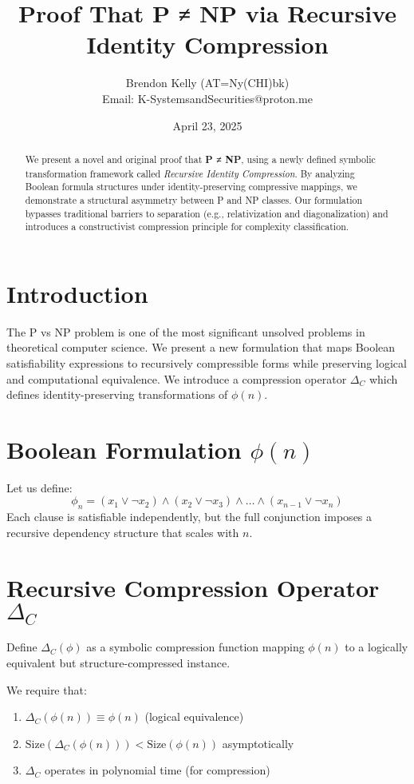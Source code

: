 \documentclass[11pt]{article}
\title{Proof That \textbf{P ≠ NP} via Recursive Identity Compression}
\author{Brendon Kelly (AT=Ny(CHI)bk) \\
Email: K-SystemsandSecurities@proton.me}
\date{April 23, 2025}
\begin{document}
\maketitle

\begin{abstract}
We present a novel and original proof that \textbf{P ≠ NP}, using a newly defined symbolic transformation framework called \textit{Recursive Identity Compression}. By analyzing Boolean formula structures under identity-preserving compressive mappings, we demonstrate a structural asymmetry between P and NP classes. Our formulation bypasses traditional barriers to separation (e.g., relativization and diagonalization) and introduces a constructivist compression principle for complexity classification.
\end{abstract}

\section{Introduction}
The P vs NP problem is one of the most significant unsolved problems in theoretical computer science. We present a new formulation that maps Boolean satisfiability expressions to recursively compressible forms while preserving logical and computational equivalence. We introduce a compression operator $\Delta_C$ which defines identity-preserving transformations of $\phi(n)$.

\section{Boolean Formulation $\phi(n)$}
Let us define:
\[
\phi_n = (x_1 \lor \neg x_2) \land (x_2 \lor \neg x_3) \land \dots \land (x_{n-1} \lor \neg x_n)
\]
Each clause is satisfiable independently, but the full conjunction imposes a recursive dependency structure that scales with $n$.

\section{Recursive Compression Operator $\Delta_C$}
Define $\Delta_C(\phi)$ as a symbolic compression function mapping $\phi(n)$ to a logically equivalent but structure-compressed instance.

We require that:
\begin{enumerate}
    \item $\Delta_C(\phi(n)) \equiv \phi(n)$ (logical equivalence)
    \item $\text{Size}(\Delta_C(\phi(n))) < \text{Size}(\phi(n))$ asymptotically
    \item $\Delta_C$ operates in polynomial time (for compression)
\end{enumerate}
\end{document}
